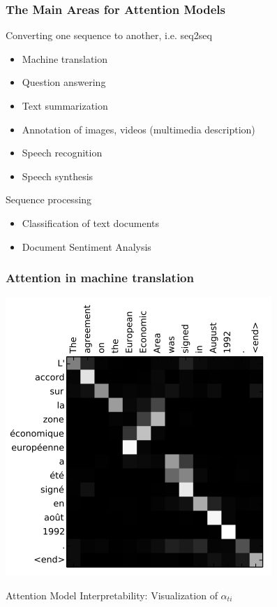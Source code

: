 \documentclass[fullscreen=true, bookmarks=true, hyperref={pdfencoding=unicode}]{beamer}
\begin{document}
\begin{frame}
\frametitle{The Main Areas for Attention Models}

   Converting one sequence to another, i.e. seq2seq
   \begin{itemize}
     \item Machine translation
     \item Question answering
     \item Text summarization
     \item Annotation of images, videos (multimedia description)
     \item Speech recognition
     \item Speech synthesis
   \end{itemize}

   \pause
   \vspace{0.5cm}
   Sequence processing
   \begin{itemize}
     \item Classification of text documents
     \item Document Sentiment Analysis
   \end{itemize}
\end{frame}


\begin{frame}
  \frametitle{Attention in machine translation}

  \begin{center}
    \includegraphics[keepaspectratio,
                   width=.5\paperwidth]{eng_to_french.png}

  {\small Attention Model Interpretability: Visualization of} $\alpha_{ti}$
  \end{center}
\end{frame}
\end{document}
